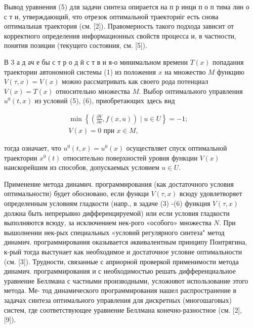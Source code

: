 \documentclass[10pt]{article}
\begin{document}
Вывод уравнения (5) для задачи синтеза опирается на п р инци п о п тима лин о с т и, утверждающий, что отрезок оптимальной траекториіг есть снова оптимальная траектория (см. [2]). Правомерность такого подхода зависит от корректного определения информационных свойств процесса и, в частности, понятия позиции (текущего состояния, см. [5]).



В 3 а д ач е бы с т р о д й с т в и я-о минимальном времени $T(x)$ попадания траектории автономной системы (1) из положения $x$ на множество $M$ функцию $V(\tau, x)=V(x)$ можно рассматривать как своего рода потенциал $V(x)=T(x)$ относительно множества $M$. Выбор оптимального управления $u^{0}(t, x)$ из условий (5), (6), приобретающих здесь вид



\[

\begin{gathered}

\min \left\{\left(\frac{\partial V}{\partial x}, f(x, u)\right) \mid u \in U\right\}=-1 ; \\

V(x)=0 \text { при } x \in M,

\end{gathered}

\]



тогда означает, что $u^{0}(t, x)=u^{0}(x)$ осуществляет спуск оптимальной траектории $x^{0}(t)$ относительно поверхностей уровня функции $V(x)$ наискорейшим из способов, допускаемых условием $u \in U$.



Применение метода динамич. программирования (как достаточного условия оптимальности) будет обосновано, если функци $V(\tau, x)$ всюду удовлетворяет определенным условиям гладкости (напр., в задаче (3) -(6) функция $V(\tau, x)$ должна быть непрерывно дифференцируемой) или если условия гладкости выполняются всюду, за исключением нек-рого «особого» множества $N$. При вышолнении нек-рых специальных «условий регулярного синтеза" метод динамич. программирования оказывается әквивалентным принципу Понтрягина, к-рый тогда выстунает как необходимое и достаточное условие оптимальности (см. [3]). Трудности, связанные с априорной проверкой применимости метода динамич. программирования и с необходимостью решать дифференциальное уравнение Беллмана с частными производными, усложняют использование этого метода. Ме- тод динамического программирования нашел распространение в задачах синтеза оптимального управления для дискретных (многошаговых) систем, где соответствующее уравнение Беллмана конечно-разностное (см. [2], [9]).
\end{document}
